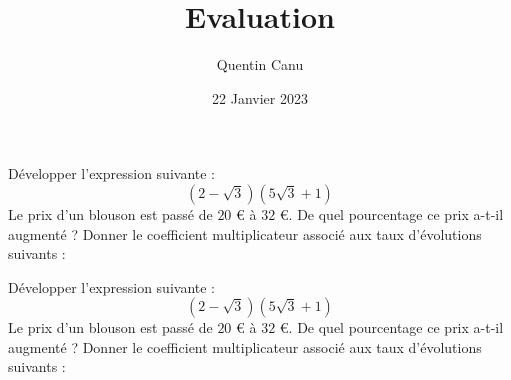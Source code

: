 \documentclass{exam}
\title{Evaluation}
\date{22 Janvier 2023}
\author{Quentin Canu}
\begin{document}
\begin{questions}
\question Développer l'expression suivante :
\begin{equation*}
(2 - \sqrt{3})(5\sqrt{3} + 1)
\end{equation*}
\vspace*{0.5cm}
\question Le prix d'un blouson est passé de $20$ \euro{} à $32$ \euro. De quel pourcentage ce prix a-t-il augmenté ?
\vspace*{0.5cm}
\question Donner le coefficient multiplicateur associé aux taux d'évolutions suivants :
\vspace*{1cm}
\end{questions}
\begin{questions}
\question Développer l'expression suivante :
\begin{equation*}
(2 - \sqrt{3})(5\sqrt{3} + 1)
\end{equation*}
\vspace*{0.5cm}
\question Le prix d'un blouson est passé de $20$ \euro{} à $32$ \euro. De quel pourcentage ce prix a-t-il augmenté ?
\vspace*{0.5cm}
\question Donner le coefficient multiplicateur associé aux taux d'évolutions suivants :
\vspace*{1cm}
\end{questions}
\end{document}
